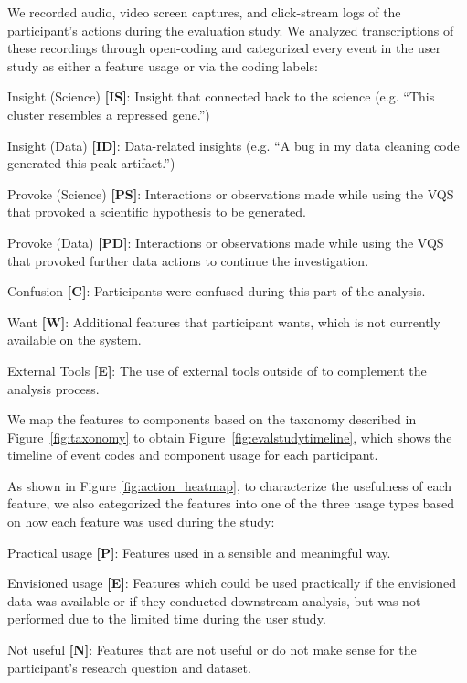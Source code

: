 We recorded audio, video screen captures, and click-stream logs of the participant's actions during the evaluation study. We analyzed transcriptions of these recordings through open-coding and categorized every event in the user study as either a feature usage or via the coding labels:
\begin{denselist}
    \item Insight (Science) \textbf{[IS]}: Insight that connected back to the science (e.g. ``This cluster resembles a repressed gene.'')
    \item Insight (Data) \textbf{[ID]}: Data-related insights (e.g. ``A bug in my data cleaning code generated this peak artifact.'')
    \item Provoke (Science) \textbf{[PS]}: Interactions or observations made while using the VQS that provoked a scientific hypothesis to be generated.
    \item Provoke (Data) \textbf{[PD]}: Interactions or observations made while using the VQS that provoked further data actions to continue the investigation.
    \item Confusion \textbf{[C]}: Participants were confused during this part of the analysis.
    \item Want \textbf{[W]}: Additional features that participant wants, which is not currently available on the system.
    \item External Tools \textbf{[E]}: The use of external tools outside of \zv to complement the analysis process.
\end{denselist}
We map the features to components based on the taxonomy described in Figure~\ref{fig:taxonomy} to obtain Figure~\ref{fig:evalstudytimeline}, which shows the timeline of event codes and component usage for each participant.
\par As shown in Figure \ref{fig:action_heatmap}, to characterize the usefulness of each feature, we also categorized the features into one of the three usage types based on how each feature was used during the study:
\begin{denselist}
    \item Practical usage \textbf{[P]}: Features used in a sensible and meaningful way.
    \item Envisioned usage \textbf{[E]}: Features which could be used practically if the envisioned data was available or if they conducted downstream analysis, but was not performed due to the limited time during the user study.
    \item Not useful \textbf{[N]}: Features that are not useful or do not make sense for the participant's research question and dataset.
\end{denselist}
